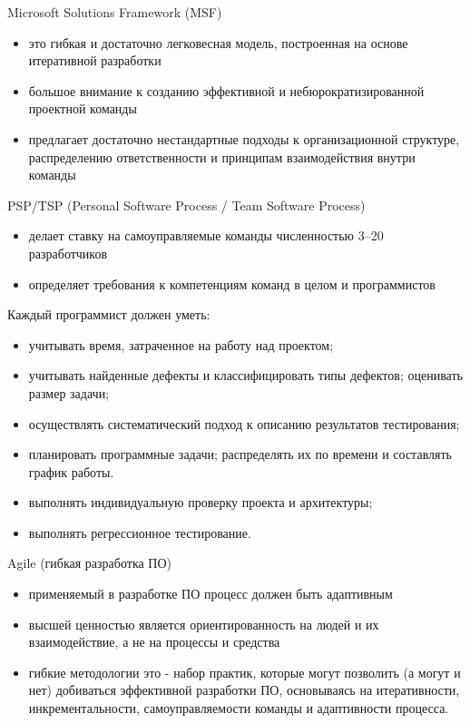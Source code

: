\documentclass{beamer}
\begin{document}
\begin{frame}[t]
Microsoft Solutions Framework (MSF)
\begin{itemize}
\item это гибкая и достаточно легковесная модель, построенная на основе итеративной разработки
\item большое внимание к созданию эффективной и небюрократизированной проектной команды
\item предлагает достаточно нестандартные подходы к организационной структуре, распределению ответственности и принципам взаимодействия внутри команды
\end{itemize}
\end{frame}

\begin{frame}[t]
PSP/TSP (Personal Software Process / Team Software Process)
\begin{itemize}
\item делает ставку на самоуправляемые команды численностью 3–20 разработчиков
\item определяет требования к компетенциям команд в целом и программистов
\end{itemize}
Каждый программист должен уметь:
\begin{itemize}
\item учитывать время, затраченное на работу над проектом;
\item учитывать найденные дефекты и классифицировать типы дефектов;
оценивать размер задачи;
\item осуществлять систематический подход к описанию результатов
тестирования;
\item планировать программные задачи; распределять их по времени и составлять график работы.
\item выполнять индивидуальную проверку проекта и архитектуры;
\item выполнять регрессионное тестирование.
\end{itemize}
\end{frame}

\begin{frame}[t]
Agile (гибкая разработка ПО)
\begin{itemize}
\item применяемый в разработке ПО процесс должен быть адаптивным
\item высшей ценностью является ориентированность на людей и их взаимодействие, а не на процессы и средства
\item гибкие методологии это - набор практик, которые могут позволить (а могут и нет) добиваться эффективной разработки ПО, основываясь на итеративности, инкрементальности, самоуправляемости команды и адаптивности процесса.
\end{itemize}
\end{frame}
\end{document}

